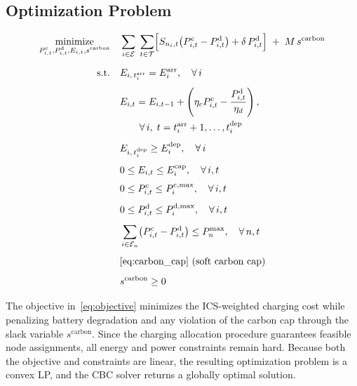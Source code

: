 \documentclass[sustainability,article,submit,moreauthors,pdftex]{Definitions/mdpi}
\begin{document}
\subsection{Optimization Problem}

\begin{subequations}
\label{eq:full_problem}
\begin{align}
\underset{
\substack{
P^{\mathrm{c}}_{i,t},
P^{\mathrm{d}}_{i,t},
E_{i,t},
s^{\mathrm{carbon}}
}
}{\text{minimize}}
\quad
&
\sum_{i \in \mathcal{E}}\; \sum_{t \in \mathcal{T}}
\Bigl[
  S_{n_i,t}
  \bigl( P^{\mathrm{c}}_{i,t} - P^{\mathrm{d}}_{i,t} \bigr)
  +
  \delta\, P^{\mathrm{d}}_{i,t}
\Bigr]
\;+\;
M\, s^{\mathrm{carbon}}
\label{eq:objective}
\\[6pt]
\text{s.t.}
\quad
& E_{i,\, t_i^{\mathrm{arr}}} = E_i^{\mathrm{arr}},
  \quad \forall\, i
\label{eq:init_soc}
\\[4pt]
& E_{i,t}
=
E_{i,t-1}
+
\left(
\eta_c P^{\mathrm{c}}_{i,t}
-
\frac{P^{\mathrm{d}}_{i,t}}{\eta_d}
\right),
\label{eq:battery_dynamics}
\\
& \qquad
\forall\, i,\;
t=t_i^{\mathrm{arr}}+1,\ldots,t_i^{\mathrm{dep}}
\nonumber
\\[4pt]
& E_{i,\, t_i^{\mathrm{dep}}} \ge E_i^{\mathrm{dep}},
  \quad \forall\, i
\label{eq:dep_soc}
\\[4pt]
& 0 \le E_{i,t} \le E_i^{\mathrm{cap}},
  \quad \forall\, i, t
\label{eq:battery_limit}
\\[4pt]
& 0 \le P^{\mathrm{c}}_{i,t} \le P_i^{\mathrm{c,max}},
  \quad \forall\, i, t
\label{eq:charge_limit}
\\[4pt]
& 0 \le P^{\mathrm{d}}_{i,t} \le P_i^{\mathrm{d,max}},
  \quad \forall\, i, t
\label{eq:discharge_limit}
\\[4pt]
& \sum_{i \in \mathcal{E}_n}
  \bigl( P^{\mathrm{c}}_{i,t} - P^{\mathrm{d}}_{i,t} \bigr)
  \le P_n^{\max},
  \quad \forall\, n, t
\label{eq:node_limit}
\\[4pt]
& \text{\eqref{eq:carbon_cap} (soft carbon cap)}
\nonumber
\\[4pt]
& s^{\mathrm{carbon}} \ge 0
\label{eq:slack_bound}
\end{align}
\end{subequations}

The objective in~\eqref{eq:objective} minimizes the ICS-weighted charging cost while penalizing battery degradation and any violation of the carbon cap through the slack variable $s^{\mathrm{carbon}}$. Since the charging allocation procedure guarantees feasible node assignments, all energy and power constraints remain hard. Because both the objective and constraints are linear, the resulting optimization problem is a convex LP, and the CBC solver returns a globally optimal solution.
\end{document}
